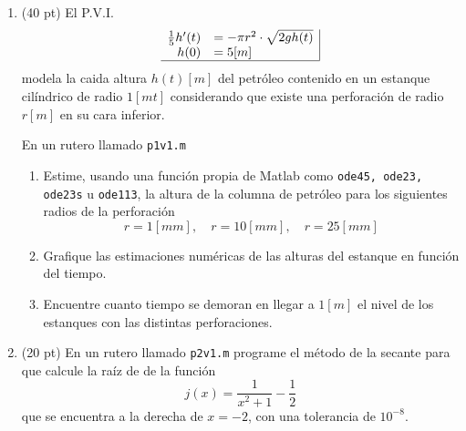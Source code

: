 \documentclass[11pt]{article}
\begin{document}
\begin{enumerate}
\item (40 pt) El P.V.I.
$$
\begin{array}{rl|}
\frac{1}{5}h'(t)	&= -\pi r^2\cdot \sqrt{2 g h(t)}\\
h(0)	&= 5[m] \\ \hline
\end{array}
$$
modela la caida altura $h(t)[m]$ del petr\'oleo contenido en un estanque cil\'indrico de radio $1[mt]$ considerando que existe una perforaci\'on de radio $r[m]$ en su cara inferior.

En un rutero llamado \texttt{p1v1.m}
\begin{enumerate}
	\item Estime, usando una funci\'on propia de Matlab como \texttt{ode45, ode23, ode23s} u \texttt{ode113}, la altura de la columna de petr\'oleo para los siguientes radios de la perforaci\'on
$$
r=1[mm], \quad r=10[mm] ,\quad r=25[mm]
$$
	\item Grafique las estimaciones num\'ericas de las alturas del estanque en funci\'on del tiempo.
    \item Encuentre cuanto tiempo se demoran en llegar a $1[m]$ el nivel de los estanques con las distintas perforaciones.
\end{enumerate}



\item (20 pt) En un rutero llamado \texttt{p2v1.m} programe el m\'etodo de la secante para que calcule la ra\'iz de de la funci\'on 
$$
j(x)=\frac{1}{x^2+1}-\frac{1}{2}
$$
que se encuentra a la derecha de $x=-2$, con una tolerancia de $10^{-8}$.


\end{enumerate}
\end{document}
